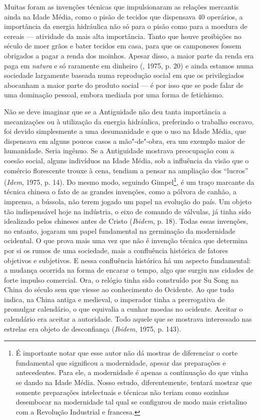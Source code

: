 Muitas foram as invenções técnicas que impulsionaram as relações
mercantis ainda na Idade Média, como o pisão de tecidos que dispensava
40 operários, a importância da energia hidráulica não só para o pisão
como para a moedura de cereais --- atividade da mais alta importância.
Tanto que houve proibições no século  de moer grãos e bater tecidos
em casa, para que os camponeses fossem obrigados a pagar a renda dos
moinhos. Apesar disso, a maior parte da renda era paga em \emph{natura}
e só raramente em dinheiro (, 1975, p. 20) e ainda estamos numa
sociedade largamente baseada numa reprodução social em que os
privilegiados abocanham a maior parte do produto social --- é por isso
que se pode falar de uma dominação pessoal, embora mediada por uma forma
de fetichismo.

Não se deve imaginar que se a Antiguidade não deu tanta importância a
mecanizações ou à utilização da energia hidráulica, preferindo o
trabalho escravo, foi devido simplesmente a uma desumanidade e que o uso
na Idade Média, que dispensava em alguns poucos casos a mão"-de"-obra, era
um exemplo maior de humanidade. Seria ingênuo. Se a Antiguidade mostrava
preocupação com a coesão social, alguns indivíduos na Idade Média, sob a
influência da visão que o comércio florescente trouxe à cena, tendiam a
pensar na ampliação dos ``lucros'' (\emph{Idem}, 1975, p. 14). Do mesmo
modo, seguindo Gimpel\footnote{É importante notar que esse autor não dá
  mostras de diferenciar o corte fundamental que significou a
  modernidade, apesar das preparações e antecedentes. Para ele, a
  modernidade é apenas a continuação do que vinha se dando na Idade
  Média. Nosso estudo, diferentemente, tentará mostrar que somente
  preparações intelectuais e técnicas não teriam como sozinhas
  desembocar na modernidade tal qual se configurou de modo mais
  cristalino com a Revolução Industrial e francesa.}, é um traço
marcante da técnica chinesa o fato de as grandes invenções, como a
pólvora de canhão, a imprensa, a bússola, não terem jogado um papel na
evolução do país. Um objeto tão indispensável hoje na indústria, o eixo
de comando de válvulas, já tinha sido idealizado pelos chineses antes de
Cristo (\emph{Ibidem}, p. 18). Todas essas invenções, no entanto,
jogaram um papel fundamental na germinação da modernidade ocidental. O
que prova mais uma vez que não é invenção técnica que determina por si
os rumos de uma sociedade, mais a confluência histórica de fatores
objetivos e subjetivos. E nessa confluência histórica há um aspecto
fundamental: a mudança ocorrida na forma de encarar o tempo, algo que surgiu
nas cidades de forte impulso comercial. Ora, o relógio tinha sido
construído por Su Song na China do século  sem que viesse ao
conhecimento do Ocidente. Ao que tudo indica, na China antiga e
medieval, o imperador tinha a prerrogativa de promulgar calendário, o
que equivalia a cunhar moedas no ocidente. Aceitar o calendário era
aceitar a autoridade. Todo aquele que se mostrava interessado nas
estrelas era objeto de desconfiança (\emph{Ibidem}, 1975, p. 143).

